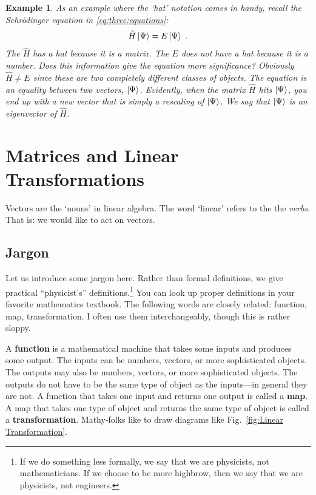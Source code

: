 \documentclass[12pt]{article}
\newtheorem{example}{Example}[section]
\begin{document}
\begin{example}
As an example where the `hat' notation comes in handy, recall the Schr\"odinger equation in \eqref{eq:three:equations}:
\begin{align}
    \hat H \left|\Psi\right\rangle = E \left|\Psi\right\rangle \ .
\end{align}
The $\hat H$ has a hat because it is a matrix. The $E$ does not have a hat because it is a number. Does this information give the equation more significance? Obviously $\hat H \neq E$ since these are two completely different classes of objects. The equation is an equality between two vectors, $\left|\Psi\right\rangle$. Evidently, when the matrix $\hat H$ hits $\left|\Psi\right\rangle$, you end up with a new vector that is simply a rescaling of $\left|\Psi\right\rangle$. We say that $\left|\Psi\right\rangle$ is an \emph{eigenvector} of $\hat H$. 
\end{example}



\section{Matrices and Linear Transformations}

Vectors are the `nouns' in linear algebra. The word `linear' refers to the the \emph{verbs}. That is: we would like to act on vectors. 







\subsection{Jargon}
Let us introduce some jargon here. Rather than formal definitions, we give practical ``physicist's'' definitions.\footnote{If we do something less formally, we say that we are physicists, not mathematicians. If we choose to be more highbrow, then we say that we are physicists, not engineers.} You can look up proper definitions in your favorite mathematics textbook.  The following words are closely related: function, map, transformation. I often use them interchangeably, though this is rather sloppy.  

A \textbf{function} is a mathematical machine that takes some inputs and produces some output. The inputs can be numbers, vectors, or more sophisticated objects. The outputs may also be numbers, vectors, or more sophisticated objects. The outputs do not have to be the same type of object as the inputs---in general they are not.
% 
A function that takes one input and returns one output is called a \textbf{map}. 
% 
A map that takes one type of object and returns the same type of object is called a \textbf{transformation}. Mathy-folks like to draw diagrams like Fig.~\ref{fig:Linear Transformation}.
\end{document}
